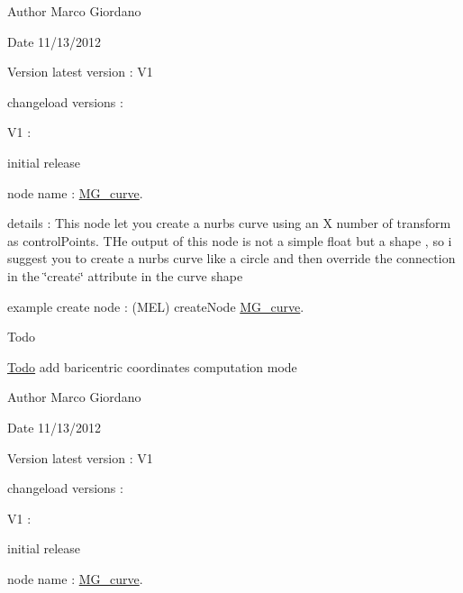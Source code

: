 \begin{DoxyAuthor}{Author}
Marco Giordano 
\end{DoxyAuthor}
\begin{DoxyDate}{Date}
11/13/2012 
\end{DoxyDate}
\begin{DoxyVersion}{Version}
latest version \-: V1 

changeload versions \-: \par
 V1 \-: \par

\begin{DoxyItemize}
\item initial release \par

\end{DoxyItemize}
\end{DoxyVersion}
node name \-: \hyperlink{class_m_g__curve}{M\-G\-\_\-curve}.

details \-: This node let you create a nurbs curve using an X number of transform as control\-Points. T\-He output of this node is not a simple float but a shape , so i suggest you to create a nurbs curve like a circle and then override the connection in the \char`\"{}create\char`\"{} attribute in the curve shape

example create node \-: (M\-E\-L) create\-Node \hyperlink{class_m_g__curve}{M\-G\-\_\-curve}.

\begin{DoxyRefDesc}{Todo}
\item[\hyperlink{todo__todo000002}{Todo}]add baricentric coordinates computation mode\end{DoxyRefDesc}


\begin{DoxyAuthor}{Author}
Marco Giordano 
\end{DoxyAuthor}
\begin{DoxyDate}{Date}
11/13/2012 
\end{DoxyDate}
\begin{DoxyVersion}{Version}
latest version \-: V1 

changeload versions \-: \par
 V1 \-: \par

\begin{DoxyItemize}
\item initial release \par

\end{DoxyItemize}
\end{DoxyVersion}
node name \-: \hyperlink{class_m_g__curve}{M\-G\-\_\-curve}.

